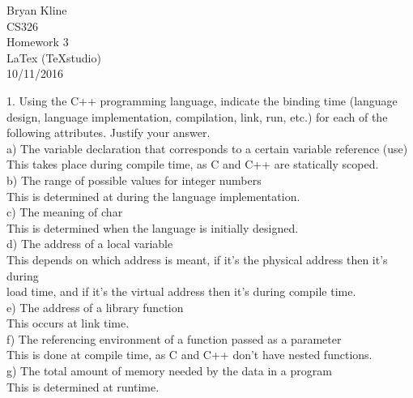 \documentclass[12pt]{article}
\begin{document}
\begin{center}

\Huge
Bryan Kline\\
[10mm]
CS326\\ 
[10mm]
Homework 3\\
\small LaTex (TeXstudio)\\
[10mm]
\Huge
10/11/2016\\
[200mm]

\end{center}

\begin{flushleft}

1. Using the C++ programming language, indicate the binding time (language design, language implementation, compilation, link, run, etc.) for each of the following attributes.  Justify your answer.\\
[2mm]

\qquad a) The variable declaration that corresponds to a certain variable reference (use)\\ 
\qquad \qquad This takes place during compile time, as C and C++ are statically scoped.\\
\qquad b) The range of possible values for integer numbers\\ 
\qquad \qquad This is determined at during the language implementation.\\
\qquad c) The meaning of char\\
\qquad \qquad This is determined when the language is initially designed.\\
\qquad d) The address of a local variable\\ 
\qquad \qquad This depends on which address is meant, if it's the physical address then it's during\\
\qquad \qquad load time, and if it's the virtual address then it's during compile time.\\
\qquad e) The address of a library function\\ 
\qquad \qquad This occurs at link time.\\
\qquad f) The referencing environment of a function passed as a parameter\\
\qquad \qquad This is done at compile time, as C and C++ don't have nested functions.\\ 
\qquad g) The total amount of memory needed by the data in a program\\
\qquad \qquad This is determined at runtime.\\
[4mm]


\end{flushleft}
\end{document}
